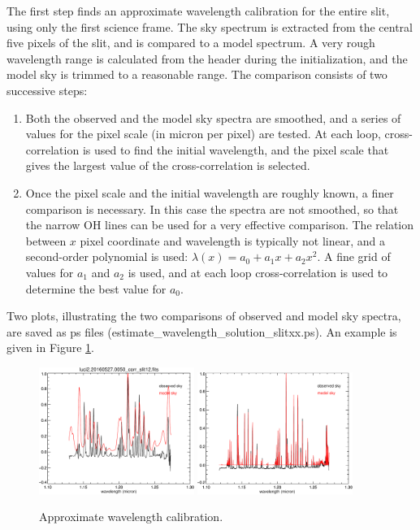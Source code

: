 \documentclass[a4paper, notitlepage]{article}
\begin{document}
The first step finds an approximate wavelength calibration for the entire slit, using only the first science frame. The sky spectrum is extracted from the central five pixels of the slit, and is compared to a model spectrum. A very rough wavelength range is calculated from the header during the initialization, and the model sky is trimmed to a reasonable range. The comparison consists of two successive steps:
\begin{enumerate}
\item Both the observed and the model sky spectra are smoothed, and a series of values for the pixel scale (in micron per pixel) are tested. At each loop, cross-correlation is used to find the initial wavelength, and the pixel scale that gives the largest value of the cross-correlation is selected.
\item Once the pixel scale and the initial wavelength are roughly known, a finer comparison is necessary. In this case the spectra are not smoothed, so that the narrow OH lines can be used for a very effective comparison. The relation between $x$ pixel coordinate and wavelength is typically not linear, and a second-order polynomial is used: $\lambda(x) = a_0 + a_1 x + a_2 x^2$. A fine grid of values for $a_1$ and $a_2$ is used, and at each loop cross-correlation is used to determine the best value for $a_0$.
\end{enumerate}

Two plots, illustrating the two comparisons of observed and model sky spectra, are saved as ps files (estimate\_wavelength\_solution\_slitxx.ps). An example is given in Figure \ref{fig:wavecal_approx}.


\begin{figure}[tbp]
\begin{minipage}{\textwidth}
   \centering
 \includegraphics[width=0.45\textwidth]{wavecal_approx_1}
   \hspace*{0.01\textwidth}
 \includegraphics[width=0.45\textwidth]{wavecal_approx_2}
\end{minipage}
\caption{Approximate wavelength calibration.}
\label{fig:wavecal_approx}
\end{figure}
\end{document}
